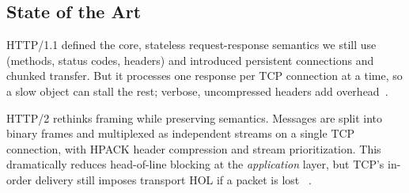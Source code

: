 %


\subsection{State of the Art}
HTTP/1.1 defined the core, stateless request-response semantics we still use
(methods, status codes, headers) and introduced persistent connections and
chunked transfer. But it processes one response per TCP connection at a time,
so a slow object can stall the rest; verbose, uncompressed headers add
overhead~\cite{rfc9110}.

HTTP/2 rethinks framing while preserving semantics. Messages are split into
binary frames and multiplexed as independent streams on a single TCP
connection, with HPACK header compression and stream prioritization. This
dramatically reduces head-of-line blocking at the \emph{application} layer, but
TCP's in-order delivery still imposes transport HOL if a packet is lost
~\cite{rfc9113}.

